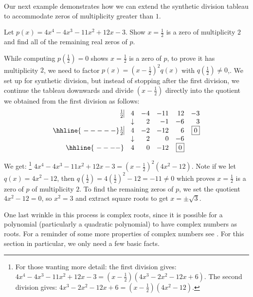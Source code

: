 \documentclass{ximera}
\begin{document}
Our next example demonstrates how we can extend the synthetic division tableau to accommodate zeros of multiplicity greater than $1$.

\begin{example}  
    Let $p(x) = 4x^4-4x^3-11x^2+12x-3$. Show $x=\frac{1}{2}$ is a zero of multiplicity $2$ and find all of the remaining real zeros of $p$.
\end{example}

\begin{exampleSol}
    While computing $p\left(\frac{1}{2} \right) = 0$ shows $x=\frac{1}{2}$  is a zero of $p$, to prove it has multiplicity $2$, we need to factor $p(x) = \left(x - \frac{1}{2}\right)^2 q(x)$ with $q\left( \frac{1}{2} \right) \neq 0$,.   We set up for synthetic division, but instead of stopping after the first division, we continue the tableau downwards and divide $\left(x - \frac{1}{2}\right)$ directly into the quotient we obtained from the first division as follows:
    \[
        \begin{array}{rrrrrr}
            \frac{1}{2}   \vline& 4 & -4 & -11  & 12 & -3 \\
            & \downarrow &  2  &  -1  & -6 & 3\\ \hhline{~-----} \frac{1}{2}   \vline&  4  &   -2  & -12 & 6 &  \fbox{$0$}  \\
            & \downarrow &  2  &  0  & -6 &\\ \hhline{~----} & 4  &   0  & -12 & \fbox{0} &   \\  
        \end{array}
    \]
    
    \setlength\arraycolsep{5pt}
    \setlength\extrarowheight{0pt}
    
    We get:%
    \footnote{
        For those wanting more detail:  the first division gives:  $4x^4-4x^3-11x^2+12x-3=\left(x-\frac{1}{2}\right) \left(4x^3-2x^2-12x+6\right)$.  The second division gives: $4x^3-2x^2-12x+6=\left(x-\frac{1}{2}\right)\left(4x^2-12\right)$.
        }
    $4x^4-4x^3-11x^2+12x-3 = \left(x-\frac{1}{2}\right)^2\left(4x^2-12\right)$.  Note if we let $q(x) = 4x^2-12$, then $q\left(\frac{1}{2} \right) = 4\left(\frac{1}{2} \right)^2 - 12 = -11 \neq 0$  which proves $x = \frac{1}{2}$ is a zero of $p$ of multiplicity $2$.   To find the remaining zeros of $p$, we set the quotient $4x^2-12=0$, so $x^2 = 3$ and extract square roots to get $x = \pm \sqrt{3}$. 
\end{exampleSol} 

One last wrinkle in this process is complex roots, since it is possible for a polynomial (particularly a quadratic polynomial) to have complex numbers as roots. For a reminder of some more properties of complex numbers see . For this section in particular, we only need a few basic facts.
\end{document}
